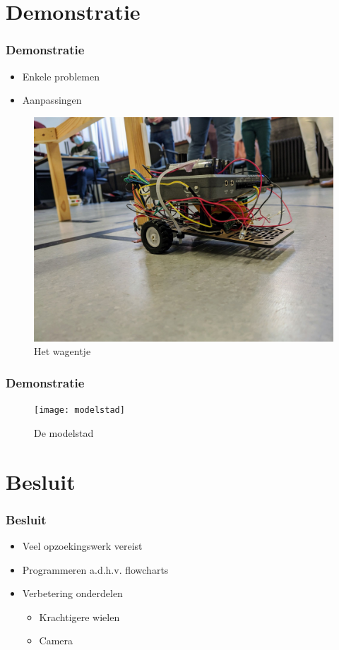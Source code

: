 \documentclass
   [kulak] %
   {kulakbeamer}
\begin{document}
\section{Demonstratie}

\begin{frame}
	\frametitle{Demonstratie}
	\begin{itemize}
		\item Enkele problemen
		\item Aanpassingen
	\end{itemize}
	\begin{figure}
		\centering
		\includegraphics[width=.5\textwidth]{fotowagen}
		\caption{Het wagentje}
	\end{figure}
\end{frame}


\begin{frame}
	\frametitle{Demonstratie}
	\begin{figure}
		\centering
		\texttt{[image: modelstad]}
		\caption{De modelstad}
	\end{figure}
\end{frame}

\section{Besluit}
\begin{frame}
\frametitle{Besluit}
	\begin{itemize}
	\item Veel opzoekingswerk vereist
	\item Programmeren a.d.h.v. flowcharts
	\item Verbetering onderdelen
		\begin{itemize}
		\item Krachtigere wielen
		\item Camera
		\end{itemize}
\end{itemize}
\end{frame}
\end{document}

